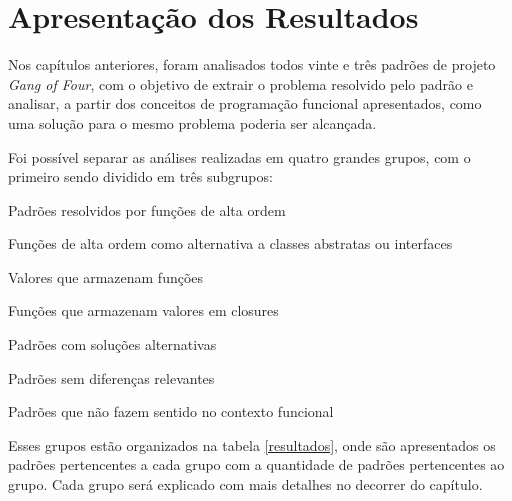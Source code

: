 \chapter{Apresentação dos Resultados}

Nos capítulos anteriores, foram analisados todos 
vinte e três padrões de projeto \textit{Gang of 
Four}, com o objetivo de extrair o problema 
resolvido pelo padrão e analisar, a partir dos 
conceitos de programação funcional apresentados, 
como uma solução para o mesmo problema poderia ser 
alcançada. 

Foi possível separar as análises realizadas em 
quatro grandes grupos, com o primeiro sendo 
dividido em três subgrupos: 

\begin{alineas}
    \item Padrões resolvidos por funções de alta ordem
    \begin{alineas}
        \item Funções de alta ordem como alternativa a classes abstratas ou interfaces
        \item Valores que armazenam funções
        \item Funções que armazenam valores em closures
    \end{alineas}
    \item Padrões com soluções alternativas
    \item Padrões sem diferenças relevantes
    \item Padrões que não fazem sentido no contexto funcional
\end{alineas}

Esses grupos estão organizados na tabela 
\ref{resultados}, onde são apresentados os 
padrões pertencentes a cada grupo com a 
quantidade de padrões pertencentes ao grupo. 
Cada grupo será explicado com mais detalhes 
no decorrer do capítulo.

